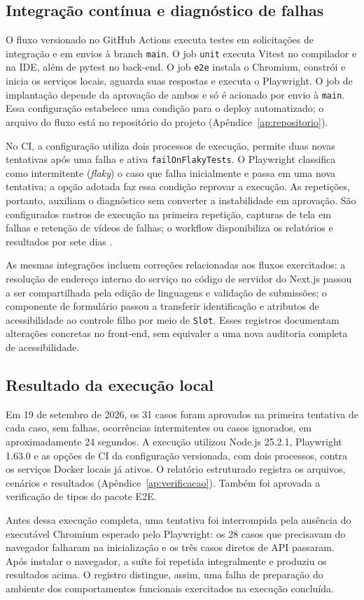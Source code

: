 \subsection{Integração contínua e diagnóstico de falhas}
\label{subsec:ci-plataforma}

O fluxo versionado no GitHub Actions executa testes em solicitações de integração e em envios à branch \texttt{main}. O job \texttt{unit} executa Vitest no compilador e na IDE, além de pytest no back-end. O job \texttt{e2e} instala o Chromium, constrói e inicia os serviços locais, aguarda suas respostas e executa o Playwright. O job de implantação depende da aprovação de ambos e só é acionado por envio à \texttt{main}. Essa configuração estabelece uma condição para o deploy automatizado; o arquivo do fluxo está no repositório do projeto (Apêndice~\ref{ap:repositorio}).

No CI, a configuração utiliza dois processos de execução, permite duas novas tentativas após uma falha e ativa \texttt{failOnFlakyTests}. O Playwright classifica como intermitente (\textit{flaky}) o caso que falha inicialmente e passa em uma nova tentativa; a opção adotada faz essa condição reprovar a execução. As repetições, portanto, auxiliam o diagnóstico sem converter a instabilidade em aprovação. São configurados rastros de execução na primeira repetição, capturas de tela em falhas e retenção de vídeos de falhas; o workflow disponibiliza os relatórios e resultados por sete dias \cite{playwright2026retries,playwright2026config}.

As mesmas integrações incluem correções relacionadas aos fluxos exercitados: a resolução de endereço interno do serviço no código de servidor do Next.js passou a ser compartilhada pela edição de linguagens e validação de submissões; o componente de formulário passou a transferir identificação e atributos de acessibilidade ao controle filho por meio de \texttt{Slot}. Esses registros documentam alterações concretas no front-end, sem equivaler a uma nova auditoria completa de acessibilidade.

\subsection{Resultado da execução local}
\label{subsec:resultado-e2e}

Em 19 de setembro de 2026, os 31 casos foram aprovados na primeira tentativa de cada caso, sem falhas, ocorrências intermitentes ou casos ignorados, em aproximadamente 24 segundos. A execução utilizou Node.js 25.2.1, Playwright 1.63.0 e as opções de CI da configuração versionada, com dois processos, contra os serviços Docker locais já ativos. O relatório estruturado registra os arquivos, cenários e resultados (Apêndice~\ref{ap:verificacao}). Também foi aprovada a verificação de tipos do pacote E2E.

Antes dessa execução completa, uma tentativa foi interrompida pela ausência do executável Chromium esperado pelo Playwright: os 28 casos que precisavam do navegador falharam na inicialização e os três casos diretos de API passaram. Após instalar o navegador, a suíte foi repetida integralmente e produziu os resultados acima. O registro distingue, assim, uma falha de preparação do ambiente dos comportamentos funcionais exercitados na execução concluída.
